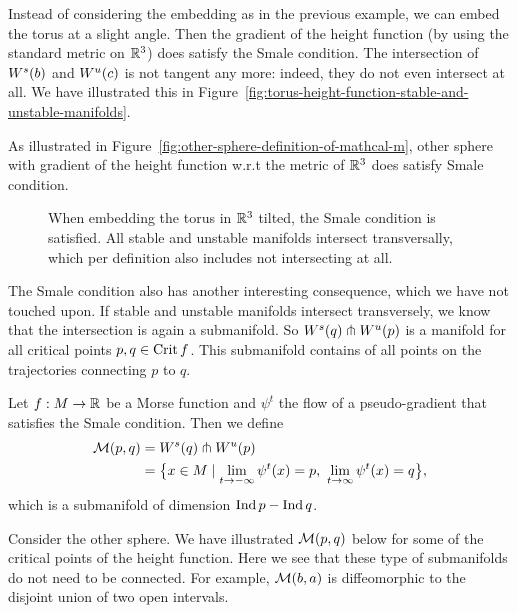     \begin{eg}
        Instead of considering the embedding as in the previous example, we can embed the torus at a slight angle.
        Then the gradient of the height function (by using the standard metric on $\mathbb{R}^3$) does satisfy the Smale condition.
        The intersection of $W^s(b)$ and  $W^u(c)$ is not tangent any more: indeed, they do not even intersect at all. We have illustrated this in Figure~\ref{fig:torus-height-function-stable-and-unstable-manifolds}.
    \end{eg}
    \begin{eg}
        As illustrated in Figure~\ref{fig:other-sphere-definition-of-mathcal-m}, other sphere with gradient of the height function w.r.t the metric of $\mathbb{R}^3$ does satisfy Smale condition. 
    \end{eg}
\begin{figure}[H]
    \centering
    \caption{
        When embedding the torus in $\mathbb{R}^3$ tilted, the Smale condition is satisfied. All stable and unstable manifolds intersect transversally, which per definition also includes not intersecting at all.
    }
    \label{fig:torus-tilted-height-function-stable-and-unstable-manifolds}
\end{figure}

The Smale condition also has another interesting consequence, which we have not touched upon.
If stable and unstable manifolds intersect transversely, we know that the intersection is again a submanifold.
So $W^s(q) \pitchfork W^u(p)$ is a manifold for all critical points $p, q \in \operatorname{Crit} f$.
This submanifold contains of all points on the trajectories connecting $p$ to $q$.
 \begin{definition}
    Let $f: M \to  \mathbb{R}$ be a Morse function and $\psi^{t}$ the flow of a pseudo-gradient that satisfies the Smale condition.
    Then we define
    \begin{align*}
        \traj{p}{q} &= \stable{q} \tcap \unstable{p}\\
                    &= \big\{
            x \in M 
            \mid 
            \lim_{t \to -\infty} \psi^{t}(x) = p, \ 
            \lim_{t \to \infty} \psi^{t}(x) = q
        \big\} 
    ,\end{align*} 
    which is a submanifold of dimension $\operatorname{Ind} p - \operatorname{Ind} q$.
\end{definition}

\begin{eg}
    Consider the other sphere. 
    We have illustrated $\mathcal M(p, q)$ below for some of the critical points of the height function.
    Here we see that these type of submanifolds do not need to be connected. For example, $\mathcal M(b, a)$ is diffeomorphic to the disjoint union of two open intervals.
\end{eg}

